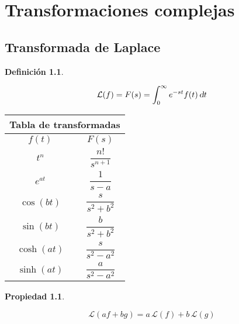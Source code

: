 \documentclass[a5paper,12pt,twoside]{book}
\newtheorem{defn}{{Definición}}[chapter]
\newtheorem{prop}{{Propiedad}}[chapter]
\begin{document}
\chapter{Transformaciones complejas}


\section{Transformada de Laplace}

\begin{mdframed}[style=DefinitionFrame]
    \begin{defn}
    \end{defn}
    \begin{equation*}
        \mathcal{L}(f) = F(s) = \int_0^\infty e^{-st} f(t) \, \textsl{d} t
    \end{equation*}
\end{mdframed}

\begin{center}
    \renewcommand{\arraystretch}{2.5}
    \begin{tabular}{|c|c|}
        \hline
        \multicolumn{2}{|c|}{Tabla de transformadas}
        \\ \hline \hline
        $f(t)$ & $F(s)$
        \\ \hline \hline
        $t^n$ & $\dfrac{n!}{s^{n+1}}$
        \\ \hline
        $e^{at}$ & $\dfrac{1}{s-a} $
        \\ \hline
        $\cos(bt)$ & $\dfrac{s}{s^2+b^2}$
        \\ \hline
        $\sin(bt)$ & $\dfrac{b}{s^2+b^2}$
        \\ \hline
        $\cosh(at)$ & $\dfrac{s}{s^2-a^2}$
        \\ \hline
        $\sinh(at)$ & $\dfrac{a}{s^2-a^2}$
        \\ \hline
    \end{tabular}
\end{center}

\begin{mdframed}[style=PropertyFrame]
    \begin{prop}
    \end{prop}
    \begin{equation*}
        \mathcal{L}(af + bg) = a \, \mathcal{L}(f) + b \, \mathcal{L}(g)
    \end{equation*}
\end{mdframed}
\end{document}
